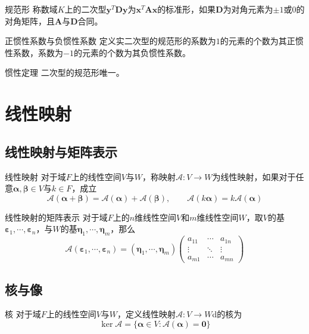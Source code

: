 \documentclass[lang = cn, scheme = chinese, thmcnt = section]{elegantbook}
\newcommand{\bs}{\boldsymbol}          %
\begin{document}
\begin{definition}{规范形}
	称数域$K$上的二次型$\bs{y}^T\bs{Dy}$为$\bs{x}^T\bs{Ax}$的标准形，如果$\bs{D}$为对角元素为$\pm1$或$0$的对角矩阵，且$\bs{A}$与$\bs{D}$合同。
\end{definition}

\begin{definition}{正惯性系数与负惯性系数}
	定义实二次型的规范形的系数为$1$的元素的个数为其正惯性系数，系数为$-1$的元素的个数为其负惯性系数。
\end{definition}

\begin{theorem}{惯性定理}
	二次型的规范形唯一。
\end{theorem}

\chapter{线性映射}

\section{线性映射与矩阵表示}

\begin{definition}{线性映射}
	对于域$F$上的线性空间$V$与$W$，称映射$\mathscr{A}:V\to W$为线性映射，如果对于任意$\bs{\alpha},\bs{\beta}\in V$与$k\in F$，成立%
	$$
	\mathscr{A}(\bs{\alpha}+\bs{\beta})=\mathscr{A}(\bs{\alpha})+\mathscr{A}(\bs{\beta}),\qquad
	\mathscr{A}(k\bs{\alpha})=k\mathscr{A}(\bs{\alpha})
	$$
\end{definition}

\begin{definition}{线性映射的矩阵表示}
	对于域$F$上的$n$维线性空间$V$和$m$维线性空间$W$，取$V$的基$\bs{\varepsilon}_1,\cdots,\bs{\varepsilon}_n$，与$W$的基$\bs{\eta}_1,\cdots,\bs{\eta}_m$，那么%
	$$
	\mathscr{A}(\bs{\varepsilon}_1,\cdots,\bs{\varepsilon}_n)
	=(\bs{\eta}_1,\cdots,\bs{\eta}_m)\begin{pmatrix}
		a_{11} & \cdots & a_{1n}\\
		\vdots & \ddots & \vdots\\
		a_{m1} & \cdots & a_{mn}
	\end{pmatrix}
	$$
\end{definition}

\section{核与像}

\begin{definition}{核}
	对于域$F$上的线性空间$V$与$W$，定义线性映射$\mathscr{A}:V\to W$d的核为%
	$$
	\ker\mathscr{A}=\{ \bs{\alpha}\in V:\mathscr{A}(\bs{\alpha})=\bs{0} \}
	$$
\end{definition}
\end{document}

